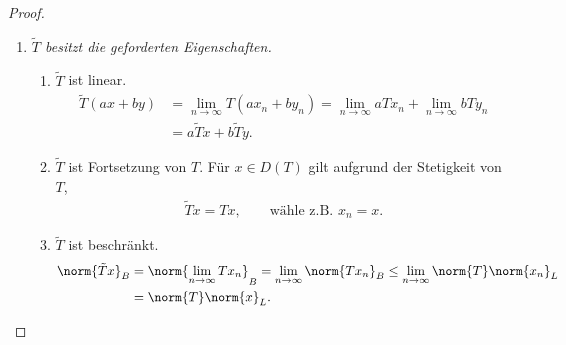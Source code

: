 \begin{proof}
\begin{enumerate}[label=\arabic{*}.)]
Sei $x_0\in L$, $(x_n)$ Folge in $D(T)$ mit $x_n\to x_0$. Setze
\begin{align*}
\tilde{T}x_0 := \lim\limits_{n\to\infty} Tx_n.
\end{align*}
\begin{enumerate}[label=\alph{*})]
  \item\label{proof:2.23:1:1} $D(T)$ liegt dicht in $L$, also existiert $(x_n)$.
  \item\label{proof:2.23:1:2} $(Tx_n)$ konvergiert.
\begin{align*}
\norm{Tx_n - Tx_m}_B \le \norm{T}\norm{x_n-x_m}_L <\norm{T}\ep,
\end{align*}
für $n,m>N_\ep$. $(x_n)$ ist konvergent und daher Cauchyfolge, also ist $(Tx_n)$
konvergent.
\item\label{proof:2.23:1:3} Die Definition von $\tilde{T}x_0$ ist unabhängig
von der Folge $(x_n)$, denn seien $x_n\to x_0$ und $x_n'\to x_0$, dann gilt
\begin{align*}
&\norm{x_n-x_n'}_L\le \norm{x_n-x_0}_L+\norm{x_0-x_n'}_L\to 0\\
\Rightarrow & \norm{Tx_n-Tx_n'}_B\le \norm{T}\norm{x_n-x_n'}_L \to 0.
\end{align*}
\end{enumerate}
\ref{proof:2.23:1:1}-\ref{proof:2.23:1:3} $\Rightarrow$ $\tilde{T}x_0$ ist
definiert für beliebige $x_0\in L$.
\item \textit{$\tilde{T}$ besitzt die geforderten Eigenschaften.}
\begin{enumerate}[label=\alph{*})]
\item $\tilde{T}$ ist linear.
\begin{align*}
\tilde{T}(ax+by) &= \lim\limits_{n\to\infty} T(ax_n+by_n) =
\lim\limits_{n\to\infty} aTx_n + \lim\limits_{n\to\infty} bTy_n 
\\ &= a\tilde{T}x + b\tilde{T}y.  
\end{align*}
\item $\tilde{T}$ ist Fortsetzung von $T$. Für $x\in D(T)$ gilt aufgrund der
Stetigkeit von $T$,
\begin{align*}
\tilde{T}x = Tx,\qquad \text{wähle z.B. }x_n = x.
\end{align*}
\item $\tilde{T}$ ist beschränkt.
\begin{align*}
\norm{\tilde{T}x}_B &= \norm{\lim\limits_{n\to\infty}Tx_n}_B =
\lim\limits_{n\to\infty}\norm{Tx_n}_B \le
\lim\limits_{n\to\infty}\norm{T}\norm{x_n}_L \\ &= \norm{T}\norm{x}_L.

\end{align*}
\end{enumerate}
\end{enumerate}
\end{proof}
